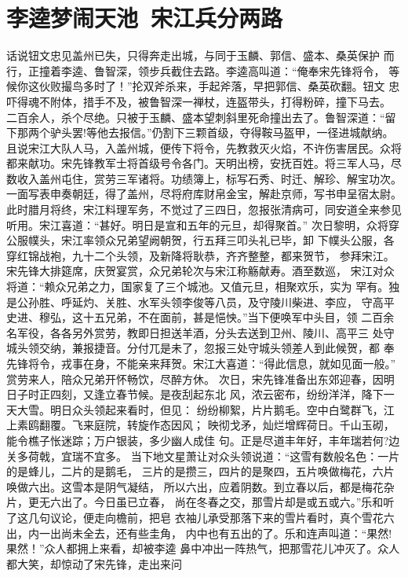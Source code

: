 \chapter{李逵梦闹天池~宋江兵分两路}

话说钮文忠见盖州已失，只得奔走出城，与同于玉麟、郭信、盛本、桑英保护
而行，正撞着李逵、鲁智深，领步兵截住去路。李逵高叫道：“俺奉宋先锋将令，
等候你这伙败撮鸟多时了！”抡双斧杀来，手起斧落，早把郭信、桑英砍翻。钮文
忠吓得魂不附体，措手不及，被鲁智深一禅杖，连盔带头，打得粉碎，撞下马去。
二百余人，杀个尽绝。只被于玉麟、盛本望刺斜里死命撞出去了。鲁智深道：“留
下那两个驴头罢!等他去报信。”仍割下三颗首级，夺得鞍马盔甲，一径进城献纳。
且说宋江大队人马，入盖州城，便传下将令，先教救灭火焰，不许伤害居民。众将
都来献功。宋先锋教军士将首级号令各门。天明出榜，安抚百姓。将三军人马，尽
数收入盖州屯住，赏劳三军诸将。功绩簿上，标写石秀、时迁、解珍、解宝功次。
一面写表申奏朝廷，得了盖州，尽将府库财帛金宝，解赴京师，写书申呈宿太尉。
此时腊月将终，宋江料理军务，不觉过了三四日，忽报张清病可，同安道全来参见
听用。宋江喜道：“甚好。明日是宣和五年的元旦，却得聚首。”
次日黎明，众将穿公服幞头，宋江率领众兄弟望阙朝贺，行五拜三叩头礼已毕，卸
下幞头公服，各穿红锦战袍，九十二个头领，及新降将耿恭，齐齐整整，都来贺节，
参拜宋江。宋先锋大排筵席，庆贺宴赏，众兄弟轮次与宋江称觞献寿。酒至数巡，
宋江对众将道：“赖众兄弟之力，国家复了三个城池。又值元旦，相聚欢乐，实为
罕有。独是公孙胜、呼延灼、关胜、水军头领李俊等八员，及守陵川柴进、李应，
守高平史进、穆弘，这十五兄弟，不在面前，甚是悒怏。”当下便唤军中头目，领
二百余名军役，各各另外赏劳，教即日担送羊酒，分头去送到卫州、陵川、高平三
处守城头领交纳，兼报捷音。分付兀是未了，忽报三处守城头领差人到此候贺，都
奉先锋将令，戎事在身，不能亲来拜贺。宋江大喜道：“得此信息，就如见面一般。”
赏劳来人，陪众兄弟开怀畅饮，尽醉方休。
次日，宋先锋准备出东郊迎春，因明日子时正四刻，又逢立春节候。是夜刮起东北
风，浓云密布，纷纷洋洋，降下一天大雪。明日众头领起来看时，但见：
纷纷柳絮，片片鹅毛。空中白鹭群飞，江上素鸥翻覆。飞来庭院，转旋作态因风；
映彻戈矛，灿烂增辉荷日。千山玉砌，能令樵子怅迷踪；万户银装，多少幽人成佳
句。正是尽道丰年好，丰年瑞若何?边关多荷戟，宜瑞不宜多。
当下地文星萧让对众头领说道：“这雪有数般名色：一片的是蜂儿，二片的是鹅毛，
三片的是攒三，四片的是聚四，五片唤做梅花，六片唤做六出。这雪本是阴气凝结，
所以六出，应着阴数。到立春以后，都是梅花杂片，更无六出了。今日虽已立春，
尚在冬春之交，那雪片却是或五或六。”乐和听了这几句议论，便走向檐前，把皂
衣袖儿承受那落下来的雪片看时，真个雪花六出，内一出尚未全去，还有些圭角，
内中也有五出的了。乐和连声叫道：“果然!果然！”众人都拥上来看，却被李逵
鼻中冲出一阵热气，把那雪花儿冲灭了。众人都大笑，却惊动了宋先锋，走出来问
